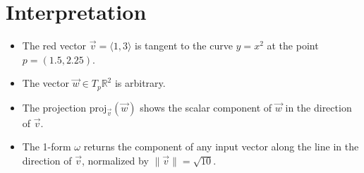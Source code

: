 \documentclass[12pt]{article}
\begin{document}
\section*{Interpretation}

\begin{itemize}
	\item The red vector \( \vec{v} = \langle 1, 3 \rangle \) is tangent to the curve \( y = x^2 \) at the point \( p = (1.5, 2.25) \).
	\item The vector \( \vec{w} \in T_p\mathbb{R}^2 \) is arbitrary.
	\item The projection \( \text{proj}_{\vec{v}}(\vec{w}) \) shows the scalar component of \( \vec{w} \) in the direction of \( \vec{v} \).
	\item The 1-form \( \omega \) returns the component of any input vector along the line in the direction of \( \vec{v} \), normalized by \( \|\vec{v}\| = \sqrt{10} \).
\end{itemize}
	
\end{document}
